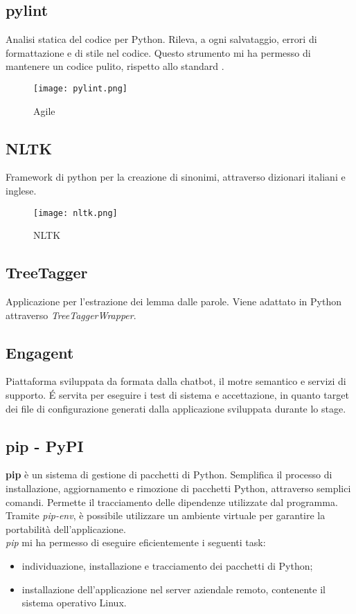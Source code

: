 \subsection*{pylint}
Analisi statica del codice per Python. Rileva, a ogni salvataggio, errori di formattazione e di stile nel codice. Questo strumento mi ha permesso di mantenere un codice pulito, rispetto allo standard . 
\begin{figure}[H]
    \centering
    \texttt{[image: pylint.png]} 
    \caption{Agile}
    \label{logo:company}
\end{figure}

\subsection*{NLTK}
Framework di python per la creazione di sinonimi, attraverso dizionari italiani e inglese.
\begin{figure}[H]
    \centering
    \texttt{[image: nltk.png]} 
    \caption{NLTK}
    \label{logo:company}
\end{figure}

\subsection*{TreeTagger}
Applicazione per l'estrazione dei lemma dalle parole. Viene adattato in Python attraverso \textit{TreeTaggerWrapper}.

\subsection*{Engagent}
Piattaforma sviluppata da {\company} formata dalla chatbot, il motre semantico e servizi di supporto. \'E servita per eseguire i test di sistema e accettazione, in quanto target dei file di configurazione generati dalla applicazione sviluppata durante lo stage.

\subsection{pip - PyPI}
\textbf{pip} è un sistema di gestione di pacchetti di Python. Semplifica il processo di installazione, aggiornamento e rimozione di pacchetti Python, attraverso semplici comandi. Permette il tracciamento delle dipendenze utilizzate dal programma. Tramite \textit{pip-env}, è possibile utilizzare un ambiente virtuale per garantire la portabilità dell'applicazione.\\
\textit{pip} mi ha permesso di eseguire eficientemente i seguenti task:
\begin{itemize}
    \item individuazione, installazione e tracciamento dei pacchetti di Python;
    \item installazione dell'applicazione nel server aziendale remoto, contenente il sistema operativo Linux.
\end{itemize}

